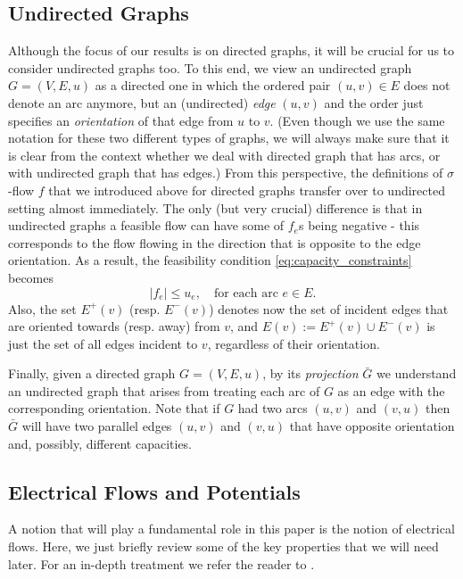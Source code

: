 \documentclass[11pt, letterpaper]{article}
\newcommand{\oG}{\bar{G}}
\newcommand{\vsigma}{\boldsymbol{\mathit{\sigma}}}
\newcommand{\ff}{\boldsymbol{\mathit{f}}}
\newcommand{\uu}{\boldsymbol{\mathit{u}}}
\begin{document}
\subsection{Undirected Graphs}

Although the focus of our results is on directed graphs, it will be crucial for us to consider undirected graphs too. To this end, we view an undirected graph $G=(V,E,\uu)$ as a directed one in which the ordered pair $(u,v)\in E$ does not denote an arc anymore, but an (undirected) {\em edge} $(u,v)$ and the order just specifies an {\em orientation} of that edge from $u$ to $v$. (Even though we use the same notation for these two different types of graphs, we will always make sure that it is clear from the context whether we deal with directed graph that has arcs, or with undirected graph that has edges.) From this perspective, the definitions of $\vsigma$-flow $\ff$ that we introduced above for directed graphs transfer over to undirected setting almost immediately. The only (but very crucial) difference  is that in undirected graphs a feasible flow can have some of $f_e$s being negative - this corresponds to the flow flowing in the direction that is opposite to the edge orientation. As a result, the feasibility condition \eqref{eq:capacity_constraints} becomes 
\begin{equation}\label{eq:undir_capacity_constraints}
|f_e|\leq u_e, \quad \text{for each arc $e\in E$}.
\end{equation} 
 Also, the set $E^+(v)$ (resp. $E^-(v)$) denotes now the set of incident edges that are oriented towards (resp. away) from $v$, and $E(v):=E^+(v)\cup E^-(v)$ is just the set of all edges incident to $v$, regardless of their orientation. 

Finally, given a directed graph $G=(V,E,\uu)$, by its {\em projection} $\oG$ we understand an undirected graph that arises from treating each arc of $G$ as an edge with the corresponding orientation. Note that if $G$ had two arcs $(u,v)$ and $(v,u)$ then $\oG$ will have two parallel edges $(u,v)$ and $(v,u)$ that have opposite orientation and, possibly, different capacities.   


\subsection{Electrical Flows and Potentials}

A notion that will play a fundamental role in this paper is the notion of electrical flows. Here, we just briefly review some of the key properties that we will need later. For an in-depth treatment we refer the reader to \cite{Bollobas98}. 
\end{document}
